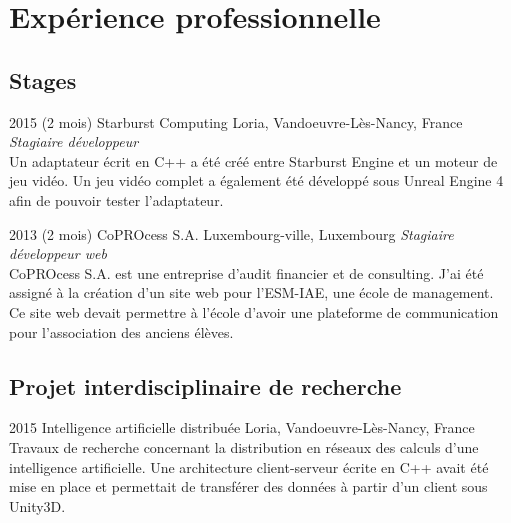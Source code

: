 \documentclass[]{cv_french} %
\begin{document}

\section{Expérience professionnelle}

\subsection{Stages}

\begin{entrylist}


\entry
{2015 (2 mois)}
{Starburst Computing}
{Loria, Vandoeuvre-Lès-Nancy, France}
{\emph{Stagiaire développeur} \\
Un adaptateur écrit en C++ a été créé entre Starburst Engine et un moteur de jeu vidéo. Un jeu vidéo complet a également été développé sous Unreal Engine 4 afin de pouvoir tester l'adaptateur. 
}

\entry
{2013 (2 mois)}
{CoPROcess S.A.}
{Luxembourg-ville, Luxembourg}
{\emph{Stagiaire développeur web} \\
CoPROcess S.A. est une entreprise d'audit financier et de consulting. J'ai été assigné à la création d'un site web pour l'ESM-IAE, une école de management. Ce site web devait permettre à l'école d'avoir une plateforme de communication pour l'association des anciens élèves.
}


\end{entrylist}

\subsection{Projet interdisciplinaire de recherche}

\begin{entrylist}

\entry
{2015}
{Intelligence artificielle distribuée}
{Loria, Vandoeuvre-Lès-Nancy, France}
{ Travaux de recherche concernant la distribution en réseaux des calculs d'une intelligence artificielle. Une architecture client-serveur écrite en C++ avait été mise en place et permettait de transférer des données à partir d'un client sous Unity3D.}


\end{entrylist}
\end{document}
